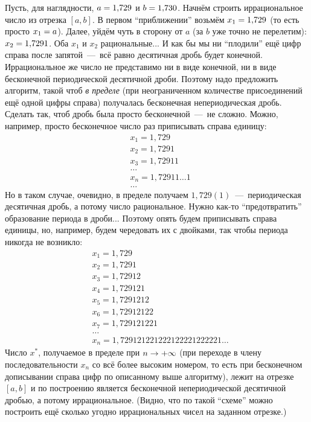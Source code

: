 \documentclass[a4paper,12pt]{article}
\begin{document}
\begin{solution}
    Пусть, для наглядности, $a \hm= 1{,}729$ и $b \hm= 1{,}730$.
    Начнём строить иррациональное число из отрезка $[a, b]$.
    В первом ``приближении'' возьмём $x_1 \hm= 1{,}729$ (то есть просто $x_1 \hm= a$).
    Далее, уйдём чуть в сторону от $a$ (за $b$ уже точно не перелетим): $x_2 \hm= 1{,}7291$.
    Оба $x_1$ и $x_2$ рациональные...
    И как бы мы ни ``плодили'' ещё цифр справа после запятой~---~всё равно десятичная дробь будет конечной.
    Иррациональное же число не представимо ни в виде конечной, ни в виде бесконечной периодической десятичной дроби.
    Поэтому надо предложить алгоритм, такой чтоб \emph{в пределе} (при неограниченном количестве присоединений ещё одной цифры справа) получалась бесконечная непериодическая дробь.
    Сделать так, чтоб дробь была просто бесконечной~---~не сложно.
    Можно, например, просто бесконечное число раз приписывать справа единицу:
    \[
      \begin{aligned}
        &x_1 = 1{,}729\\
        &x_2 = 1{,}7291\\
        &x_3 = 1{,}72911\\
        &\ldots\\
        &x_n = 1{,}72911 \ldots 1\\
        &\ldots
      \end{aligned}
    \]
    Но в таком случае, очевидно, в пределе получаем $1{,}729(1)$~---~периодическая десятичная дробь, а потому число рациональное.
    Нужно как-то ``предотвратить'' образование периода в дроби...
    Поэтому опять будем приписывать справа единицы, но, например, будем чередовать их с двойками, так чтобы периода никогда не возникло:
    \[
      \begin{aligned}
        &x_1 = 1{,}729\\
        &x_2 = 1{,}7291\\
        &x_3 = 1{,}72912\\
        &x_4 = 1{,}729121\\
        &x_5 = 1{,}7291212\\
        &x_6 = 1{,}72912122\\
        &x_7 = 1{,}729121221\\
        &\ldots\\
        &x_n = 1{,}729121221222122221222221\ldots
      \end{aligned}
    \]
    Число $x^*$, получаемое в пределе при $n \hm\to +\infty$ (при переходе в члену последовательности $x_n$ со всё более высоким номером, то есть при бесконечном дописывании справа цифр по описанному выше алгоритму), лежит на отрезке $[a, b]$ и по построению является бесконечной непериодической десятичной дробью, а потому иррациональное.
    (Видно, что по такой ``схеме'' можно построить ещё сколько угодно иррациональных чисел на заданном отрезке.)
  \end{solution}
  
\end{document}

